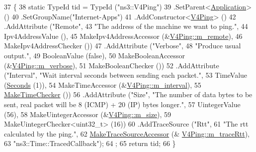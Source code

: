 \begin{DoxyCode}
37 \{
38   \textcolor{keyword}{static} TypeId tid = TypeId (\textcolor{stringliteral}{"ns3::V4Ping"})
39     .SetParent<\hyperlink{classns3_1_1Application_acd261926c72b02cdb48fc7f8838ee173}{Application}> ()
40     .SetGroupName(\textcolor{stringliteral}{"Internet-Apps"})
41     .AddConstructor<\hyperlink{classns3_1_1V4Ping_a9ab6470343fdf71770bcd6240858434d}{V4Ping}> ()
42     .AddAttribute (\textcolor{stringliteral}{"Remote"}, 
43                    \textcolor{stringliteral}{"The address of the machine we want to ping."},
44                    Ipv4AddressValue (),
45                    MakeIpv4AddressAccessor (&\hyperlink{classns3_1_1V4Ping_a30b2005deccba89dc440a120853864f2}{V4Ping::m\_remote}),
46                    MakeIpv4AddressChecker ())
47     .AddAttribute (\textcolor{stringliteral}{"Verbose"},
48                    \textcolor{stringliteral}{"Produce usual output."},
49                    BooleanValue (\textcolor{keyword}{false}),
50                    MakeBooleanAccessor (&\hyperlink{classns3_1_1V4Ping_a0b843e4454492e5a20860b6c624b667b}{V4Ping::m\_verbose}),
51                    MakeBooleanChecker ())
52     .AddAttribute (\textcolor{stringliteral}{"Interval"}, \textcolor{stringliteral}{"Wait  interval  seconds between sending each packet."},
53                    TimeValue (\hyperlink{group__timecivil_ga33c34b816f8ff6628e33d5c8e9713b9e}{Seconds} (1)),
54                    MakeTimeAccessor (&\hyperlink{classns3_1_1V4Ping_af709274c8ed4f886a1710d49c28bd5ea}{V4Ping::m\_interval}),
55                    \hyperlink{group__time_ga7032965bd4afa578691d88c09e4481c1}{MakeTimeChecker} ())
56     .AddAttribute (\textcolor{stringliteral}{"Size"}, \textcolor{stringliteral}{"The number of data bytes to be sent, real packet will be 8 (ICMP) + 20 (IP)
       bytes longer."},
57                    UintegerValue (56),
58                    MakeUintegerAccessor (&\hyperlink{classns3_1_1V4Ping_a15214114a8580f6e7c56ad18267b2199}{V4Ping::m\_size}),
59                    MakeUintegerChecker<uint32\_t> (16))
60     .AddTraceSource (\textcolor{stringliteral}{"Rtt"},
61                      \textcolor{stringliteral}{"The rtt calculated by the ping."},
62                      \hyperlink{group__tracing_gab21a770b9855af4e8f69f7531ea4a6b0}{MakeTraceSourceAccessor} (&
      \hyperlink{classns3_1_1V4Ping_abaf5eec819058e81e958ae3dadb8fbe2}{V4Ping::m\_traceRtt}),
63                      \textcolor{stringliteral}{"ns3::Time::TracedCallback"});
64   ;
65   \textcolor{keywordflow}{return} tid;
66 \}
\end{DoxyCode}


